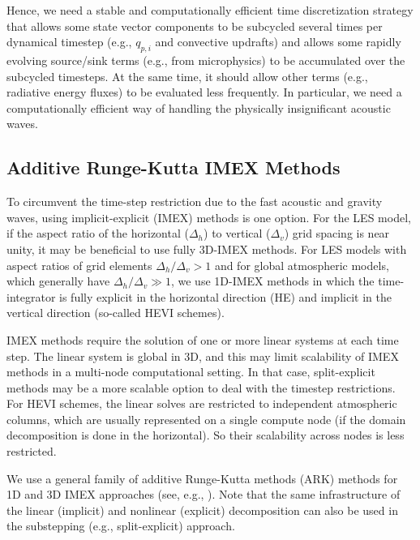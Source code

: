 \documentclass{report}
\begin{document}
{Hence, we need a stable and computationally efficient time discretization strategy that allows some state vector components to be subcycled several times per dynamical timestep (e.g., $q_{p,i}$ and convective updrafts) and allows some rapidly evolving source/sink terms (e.g., from microphysics) to be accumulated over the subcycled timesteps. At the same time, it should allow other terms (e.g., radiative energy fluxes) to be evaluated less frequently. In particular, we need a computationally efficient way of handling the physically insignificant acoustic waves.

\subsection{Additive Runge-Kutta IMEX Methods}

To circumvent the time-step restriction due to the fast acoustic and gravity waves, using implicit-explicit (IMEX) methods is one option. For the LES model, if the aspect ratio of the horizontal ($\Delta_h$) to vertical ($\Delta_v$) grid spacing is near unity, it may be beneficial to use fully 3D-IMEX methods.  For LES models with aspect ratios of grid elements $\Delta_h/\Delta_v > 1$ and for global atmospheric models, which generally have $\Delta_h/\Delta_v \gg 1$, we use 1D-IMEX methods in which the time-integrator is fully explicit in the horizontal direction (HE) and implicit in the vertical direction (so-called HEVI schemes). 

IMEX methods require the solution of one or more linear systems at each time step. The linear system is global in 3D, and this may limit scalability of IMEX methods in a multi-node computational setting. In that case, split-explicit methods may be a more scalable option to deal with the timestep restrictions. For HEVI schemes, the linear solves are restricted to independent atmospheric columns, which are usually represented on a single compute node (if the domain decomposition is done in the horizontal). So their scalability across nodes is less restricted.

We use a general family of additive Runge-Kutta methods (ARK) methods for 1D and 3D IMEX approaches (see, e.g., \citet{giraldo:2013}). Note that the same infrastructure of the linear (implicit) and nonlinear (explicit) decomposition can also be used in the substepping (e.g., split-explicit) approach.

}
\end{document}
